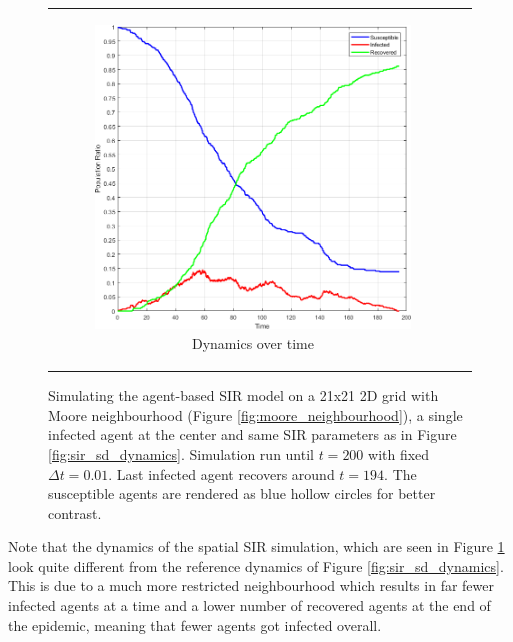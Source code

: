 \begin{figure}
\begin{center}
\begin{tabular}{c c}
		\begin{subfigure}[b]{0.23\textwidth}
			\centering
			\includegraphics[width=1\textwidth, angle=0]{./fig/SIR_Dunai/SIR_Dunai_dt001.png}
			\caption{Dynamics over time}
			\label{fig:sir_dunai_env_dynamics}
		\end{subfigure}
	\end{tabular}
	
	\caption{Simulating the agent-based SIR model on a 21x21 2D grid with Moore neighbourhood (Figure \ref{fig:moore_neighbourhood}), a single infected agent at the center and same SIR parameters as in Figure \ref{fig:sir_sd_dynamics}. Simulation run until $t = 200$ with fixed $\Delta t = 0.01$. Last infected agent recovers around $t = 194$. The susceptible agents are rendered as blue hollow circles for better contrast.}
	\label{fig:sir_dunai}
\end{center}
\end{figure}

Note that the dynamics of the spatial SIR simulation, which are seen in Figure \ref{fig:sir_dunai_env_dynamics} look quite different from the reference dynamics of Figure \ref{fig:sir_sd_dynamics}. This is due to a much more restricted neighbourhood which results in far fewer infected agents at a time and a lower number of recovered agents at the end of the epidemic, meaning that fewer agents got infected overall.

